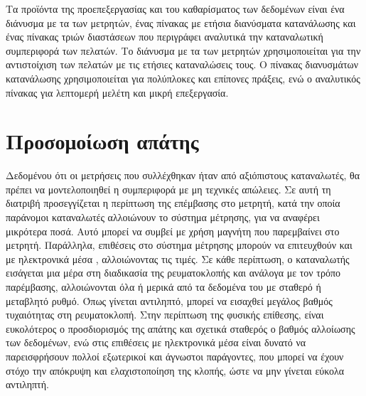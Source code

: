 Τα προϊόντα της προεπεξεργασίας και του καθαρίσματος των δεδομένων είναι ένα διάνυσμα με τα  των μετρητών, ένας πίνακας με ετήσια διανύσματα κατανάλωσης και ένας πίνακας τριών διαστάσεων που περιγράφει αναλυτικά την καταναλωτική συμπεριφορά των πελατών. Το διάνυσμα με τα  των μετρητών χρησιμοποιείται για την αντιστοίχιση των πελατών με τις ετήσιες καταναλώσεις τους. Ο πίνακας διανυσμάτων κατανάλωσης χρησιμοποιείται για πολύπλοκες και επίπονες πράξεις, ενώ ο αναλυτικός πίνακας για λεπτομερή μελέτη και μικρή επεξεργασία.
\section{Προσομοίωση απάτης}
Δεδομένου ότι οι μετρήσεις που συλλέχθηκαν ήταν από αξιόπιστους καταναλωτές, θα πρέπει να μοντελοποιηθεί η συμπεριφορά με μη τεχνικές απώλειες. Σε αυτή τη διατριβή προσεγγίζεται η περίπτωση της επέμβασης στο μετρητή, κατά την οποία παράνομοι καταναλωτές αλλοιώνουν το σύστημα μέτρησης, για να αναφέρει μικρότερα ποσά. Αυτό μπορεί να συμβεί με χρήση μαγνήτη που παρεμβαίνει στο μετρητή. Παράλληλα, επιθέσεις στο σύστημα μέτρησης μπορούν να επιτευχθούν και με ηλεκτρονικά μέσα , αλλοιώνοντας τις τιμές. Σε κάθε περίπτωση, ο καταναλωτής εισάγεται μια μέρα στη διαδικασία της ρευματοκλοπής και ανάλογα με τον τρόπο παρέμβασης, αλλοιώνονται όλα ή μερικά από τα δεδομένα του με σταθερό ή μεταβλητό ρυθμό. Όπως γίνεται αντιληπτό, μπορεί να εισαχθεί μεγάλος βαθμός τυχαιότητας στη ρευματοκλοπή. Στην περίπτωση της φυσικής επίθεσης, είναι ευκολότερος ο προσδιορισμός της απάτης και σχετικά σταθερός ο βαθμός αλλοίωσης των δεδομένων, ενώ στις επιθέσεις με ηλεκτρονικά μέσα είναι δυνατό να παρεισφρήσουν πολλοί εξωτερικοί και άγνωστοι παράγοντες, που μπορεί να έχουν στόχο την απόκρυψη και ελαχιστοποίηση της κλοπής, ώστε να μην γίνεται εύκολα αντιληπτή.
